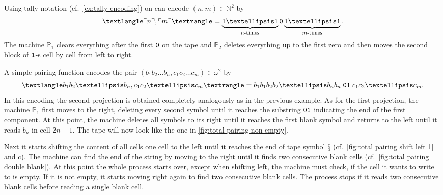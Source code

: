 \begin{exam}
  \begin{exlist}
    \item\label{ex:tally pairing}
    Using tally notation (cf.~\cref{ex:tally encoding}) on can encode $(n, m) ∈
    ℕ^2$ by
    \[
      ⟨\enc{n}, \enc{m}⟩ = \underbrace{\one … \one}_{n\text{-times}} \zer \underbrace{\one … \one}_{m\text{-times}}.
    \]
    The machine \(\mathbb{P}_1\) clears everything after the first \(\mathtt{0}\) on
    the tape and \(\mathbb{P}_2\) deletes everything up to the first zero and
    then moves the second block of \(\mathtt{1}\)-s cell by cell from left to right.

    \item\label{ex:total pairing}
    A simple pairing function encodes the pair $(b_1b_2…b_n, c_1c_2…c_m) ∈ ω^2$
    by
    \[
      ⟨b_1b_2…b_n, c_1c_2…c_m⟩ = b_1b_1b_2b_2…b_nb_n \; \zer\one \; c_1c_2…c_m.
    \]
    In this encoding the second projection is obtained completely analogously as
    in the previous example. As for the first projection, the machine
    \(\mathbb{P}_1\) first moves to the right, deleting every second symbol
    until it reaches the substring \(\mathtt{0}\mathtt{1}\) indicating the end of the first
    component. At this point, the machine deletes all symbols to its right until
    it reaches the first blank symbol and returns to the left until it reads
    \(b_n\) in cell \(2n - 1\). The tape will now look like the one in
    \cref{fig:total pairing non empty}.

    Next it starts shifting the content of all cells one cell to the left until
    it reaches the end of tape symbol \(§\) (cf.~\cref{fig:total pairing shift
    left 1} and c). The machine can find the end of the string by moving to the
    right until it finds two consecutive blank cells (cf.~\cref{fig:total
    pairing double blank}). At this point the whole process starts over, except
    when shifting left, the machine must check, if the cell it wants to write to
    is empty. If it is not empty, it starts moving right again to find two
    consecutive blank cells. The process stops if it reads two consecutive blank
    cells before reading a single blank cell.
  \end{exlist}
\end{exam}

